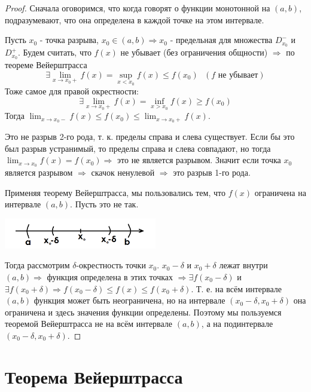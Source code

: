 	\begin{proof}
		Сначала оговоримся, что когда говорят о функции монотонной на $(a, b)$, подразумевают, что она определена в каждой точке на этом интервале.
		
		Пусть $x_0$ - точка разрыва, $x_0 \in (a, b) \Rightarrow x_0$ - предельная для множества $D^-_{x_0}$ и $D^+_{x_0}$. Будем считать, что $f(x)$ не убывает (без ограничения общности) $\Rightarrow$ по теореме Вейерштрасса 
		\[ \exists \lim_{x \to x_0+} f(x) = \sup_{x < x_0} f(x) \leqslant f(x_0) \text{ } (f \text{ не убывает}) \]
		Тоже самое для правой окрестности:
		\[ \exists \lim_{x \to x_0+} f(x) = \inf_{x > x_0} f(x) \geqslant f(x_0) \]
		Тогда $\lim_{x \to x_0-} f(x) \leqslant f(x_0) \leqslant \lim_{x \to x_0+} f(x).$
		
		Это не разрыв 2-го рода, т. к. пределы справа и слева существует. Если бы это был разрыв устранимый, то пределы справа и слева совпадают, но тогда $\lim_{x \to x_0} f(x) = f(x_0) \Rightarrow$ это не является разрывом. Значит если точка $x_0$ является разрывом $\Rightarrow$ скачок ненулевой $\Rightarrow$ это разрыв 1-го рода.
		
		Применяя теорему Вейерштрасса, мы пользовались тем, что $f(x)$ ограничена на интервале $(a, b)$. Пусть это не так.
		
		\begin{center}
			\includegraphics[width=0.5\textwidth]{img/lecture13/interval_line}
		\end{center}
		
		Тогда рассмотрим $\delta$-окрестность точки $x_0$. $x_0 - \delta$ и $x_0 + \delta$ лежат внутри $(a, b) \Rightarrow$ функция определена в этих точках $\Rightarrow \exists f(x_0 - \delta)$ и $\exists f(x_0 + \delta) \Rightarrow f(x_0 - \delta) \leqslant f(x) \leqslant f(x_0 + \delta).$ Т. е. на всём интервале $(a, b)$ функция может быть неограничена, но на интервале $(x_0 - \delta, x_0 + \delta)$ она ограничена и здесь значения функции определены. Поэтому мы пользуемся теоремой Вейерштрасса не на всём интервале $(a, b)$, а на подинтервале $(x_0 - \delta, x_0 + \delta)$.
	\end{proof}
	
	\section{Теорема Вейерштрасса}
	
